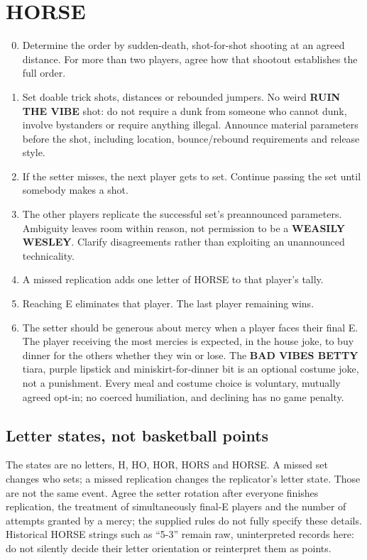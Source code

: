 \documentclass[11pt]{article}
\begin{document}
\section{HORSE}
\begin{enumerate}[start=0]
\setcounter{enumi}{-1}
\item Determine the order by sudden-death, shot-for-shot shooting at an agreed
distance. For more than two players, agree how that shootout establishes the full order.
\item Set doable trick shots, distances or rebounded jumpers. No weird
\textbf{RUIN THE VIBE} shot: do not require a dunk from someone who cannot dunk,
involve bystanders or require anything illegal. Announce material parameters
before the shot, including location, bounce/rebound requirements and release style.
\item If the setter misses, the next player gets to set. Continue passing the
set until somebody makes a shot.
\item The other players replicate the successful set's preannounced parameters.
Ambiguity leaves room within reason, not permission to be a \textbf{WEASILY WESLEY}.
Clarify disagreements rather than exploiting an unannounced technicality.
\item A missed replication adds one letter of HORSE to that player's tally.
\item Reaching E eliminates that player. The last player remaining wins.
\item The setter should be generous about mercy when a player faces their final
E. The player receiving the most mercies is expected, in the house joke, to buy
dinner for the others whether they win or lose. The \textbf{BAD VIBES BETTY}
tiara, purple lipstick and miniskirt-for-dinner bit is an optional costume joke,
not a punishment. Every meal and costume choice is voluntary, mutually agreed
opt-in; no coerced humiliation, and declining has no game penalty.
\end{enumerate}

\subsection{Letter states, not basketball points}
The states are no letters, H, HO, HOR, HORS and HORSE. A missed set changes who
sets; a missed replication changes the replicator's letter state. Those are not
the same event. Agree the setter rotation after everyone finishes replication,
the treatment of simultaneously final-E players and the number of attempts
granted by a mercy; the supplied rules do not fully specify these details.
Historical HORSE strings such as ``5-3'' remain raw, uninterpreted records here:
do not silently decide their letter orientation or reinterpret them as points.
\end{document}
